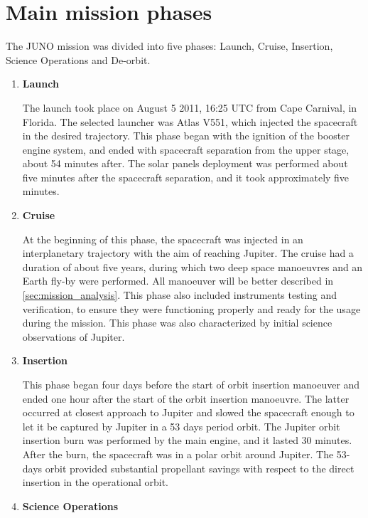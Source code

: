 \section{Main mission phases}
\label{sec:phases}

The JUNO mission was divided into five phases: Launch, Cruise, Insertion, Science Operations and De-orbit.
\begin{enumerate}
    \item \textbf{Launch} 
    

    The launch took place on August 5 2011, 16:25 UTC from Cape Carnival, in Florida. The selected launcher was Atlas V551, which injected the spacecraft in the desired trajectory.
    This phase began with the ignition of the booster engine system, and ended with spacecraft separation from the upper stage, about 54 minutes after. The solar panels deployment was performed about five minutes after the spacecraft separation, and it took approximately five minutes.

    \item \textbf{Cruise}
    
    At the beginning of this phase, the spacecraft was injected in an interplanetary trajectory with the aim of reaching Jupiter. The cruise had a duration of about five years, during which two deep space manoeuvres and an Earth fly-by were performed.
    All manoeuver will be better described in \autoref{sec:mission_analysis}. This phase also included instruments testing and verification, to ensure they were functioning properly and ready for the usage during the mission. This phase was also characterized by initial science observations of Jupiter.

    \item \textbf{Insertion}
    
    This phase began four days before the start of orbit insertion manoeuver and ended one hour after the start of the orbit insertion manoeuvre. The latter occurred at closest approach to Jupiter and slowed the spacecraft enough to let it be captured by Jupiter in a 53 days period orbit.
    The Jupiter orbit insertion burn was performed by the main engine, and it lasted 30 minutes. After the burn, the spacecraft was in a polar orbit around Jupiter.
    The 53-days orbit provided substantial propellant savings with respect to the direct insertion in the operational orbit.

    \item \textbf{Science Operations}
    

\end{enumerate}
